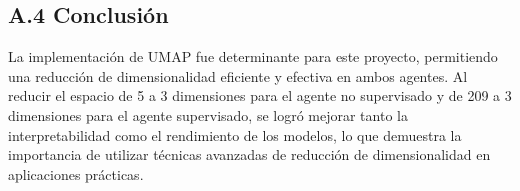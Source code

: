 \documentclass[12pt,a4paper]{article}
\begin{document}
\subsection*{A.4 Conclusión}
La implementación de UMAP fue determinante para este proyecto, permitiendo una reducción de dimensionalidad eficiente y efectiva en ambos agentes. Al reducir el espacio de 5 a 3 dimensiones para el agente no supervisado y de 209 a 3 dimensiones para el agente supervisado, se logró mejorar tanto la interpretabilidad como el rendimiento de los modelos, lo que demuestra la importancia de utilizar técnicas avanzadas de reducción de dimensionalidad en aplicaciones prácticas.
\end{document}
